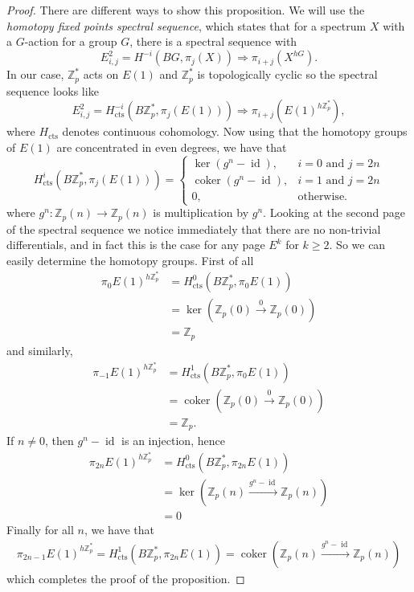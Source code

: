 \documentclass[a4paper]{article} %
\theoremstyle{definition}
\newcommand{\toWithMapLong}[1]{\overset{#1}{\longrightarrow}}
\newcommand{\Z}{\mathbb{Z}}
\DeclareMathOperator{\id}{id}           %
\DeclareMathOperator{\coker}{coker}     %
\renewcommand{\implies}{\Rightarrow}    %
\begin{document}
\begin{proof}
There are different ways to show this proposition. We will use the \textit{homotopy fixed points spectral sequence}, which states that for a spectrum $X$ with a $G$-action for a group $G$, there is a spectral sequence with
\[
E^2_{i,j} = H^{-i}(BG, \pi_j(X)) \implies \pi_{i+j}(X^{hG}).
\]
In our case, $\Z_p^*$ acts on $E(1)$ and $\Z_p^*$ is topologically cyclic so the spectral sequence looks like
\[
E^2_{i,j} = H_{\operatorname{cts}}^{-i}(B\Z_p^*, \pi_j(E(1))) \implies \pi_{i+j}(E(1)^{h\Z_p^*}),
\]
where $H_{\operatorname{cts}}$ denotes continuous cohomology. Now using that the homotopy groups of $E(1)$ are concentrated in even degrees, we have that
\[
  H^i_{\operatorname{cts}}(B\Z_p^*, \pi_j(E(1))) =
\begin{cases}
\ker (g^n - \id), & i=0 \text{ and } j=2n \\
\coker (g^n - \id), & i=1 \text{ and } j =2n \\
0, & \text{otherwise.}
\end{cases}
\]
where $g^n \colon \Z_p(n) \to \Z_p(n)$ is multiplication by $g^n$. Looking at the second page of the spectral sequence we notice immediately that there are no non-trivial differentials, and in fact this is the case for any page $E^k$ for $k \ge 2$. So we can easily determine the homotopy groups. First of all
\begin{align*}
  \pi_0 E(1)^{h\Z_p^*} & =  H^0_{\operatorname{cts}}(B\Z_p^*, \pi_0 E(1)) \\
    & = \ker (\Z_p(0) \toWithMapLong{0} \Z_p(0)) \\
    & = \Z_p
\end{align*}
and similarly,
\begin{align*}
  \pi_{-1} E(1)^{h\Z_p^*} & =  H^1_{\operatorname{cts}}(B\Z_p^*, \pi_0 E(1)) \\
    & = \coker (\Z_p(0) \toWithMapLong{0} \Z_p(0)) \\
    & = \Z_p.
\end{align*}
If $n \neq 0$, then $g^n - \id$ is an injection, hence
\begin{align*}
  \pi_{2n} E(1)^{h\Z_p^*} & = H^0_{\operatorname{cts}}(B\Z_p^*, \pi_{2n} E(1)) \\
    & =\ker (\Z_p(n) \toWithMapLong{g^n - \id} \Z_p(n)) \\
    &  = 0
\end{align*}
Finally for all $n$, we have that
\begin{align*}
  \pi_{2n-1} E(1)^{h\Z_p^*}  =  H^1_{\operatorname{cts}}(B\Z_p^*, \pi_{2n} E(1))
    = \coker (\Z_p(n) \toWithMapLong{g^n - \id} \Z_p(n))
\end{align*}
which completes the proof of the proposition.
\end{proof}
\end{document}
